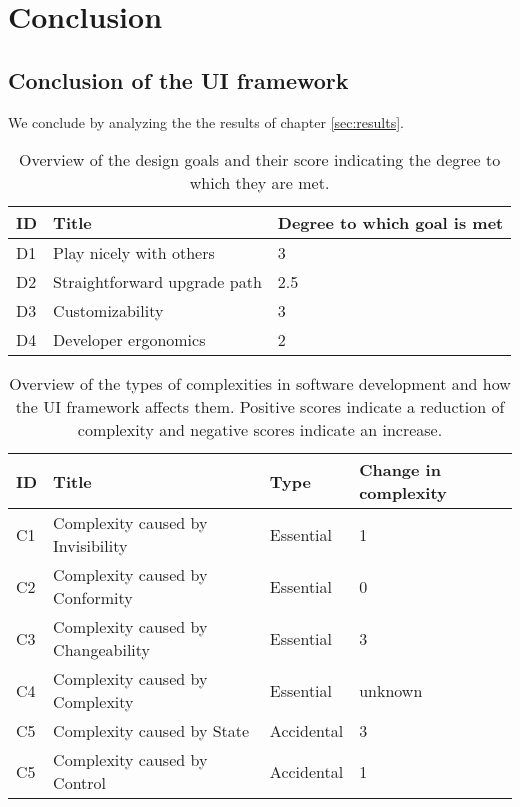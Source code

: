 \section{Conclusion}\label{conclusion}

\subsection{Conclusion of the UI framework}
We conclude by analyzing the the results of chapter \ref{sec:results}.

\begin{table}[!htb]
  \begin{center}
    \begin{tabular}{|l|l|l|}
      \hline
      \textbf{ID} & \textbf{Title} & \textbf{Degree to which goal is met} \\
      \hline
      D1 & Play nicely with others & 3 \\
      \hline
      D2 & Straightforward upgrade path & 2.5 \\
      \hline
      D3 & Customizability & 3 \\
      \hline
      D4 & Developer ergonomics & 2 \\
      \hline
    \end{tabular}
    \caption{Overview of the design goals and their score indicating the degree to which they are met.}
  \end{center}
\end{table}

\begin{table}[!htb]
  \begin{center}
    \begin{tabular}{|l|l|l|l|}
      \hline
      \textbf{ID} & \textbf{Title} & \textbf{Type} & \textbf{Change in complexity} \\
      \hline
      C1 & Complexity caused by Invisibility & Essential & 1 \\
      \hline
      C2 & Complexity caused by Conformity & Essential & 0 \\
      \hline
      C3 & Complexity caused by Changeability & Essential & 3 \\
      \hline
      C4 & Complexity caused by Complexity & Essential & unknown \\
      \hline
      C5 & Complexity caused by State & Accidental & 3 \\
      \hline
      C5 & Complexity caused by Control & Accidental & 1 \\
      \hline
    \end{tabular}
    \caption{Overview of the types of complexities in software development and how the UI framework affects them. Positive scores indicate a reduction of complexity and negative scores indicate an increase.}
    \label{tab:summarycomplexity}
  \end{center}
\end{table}


